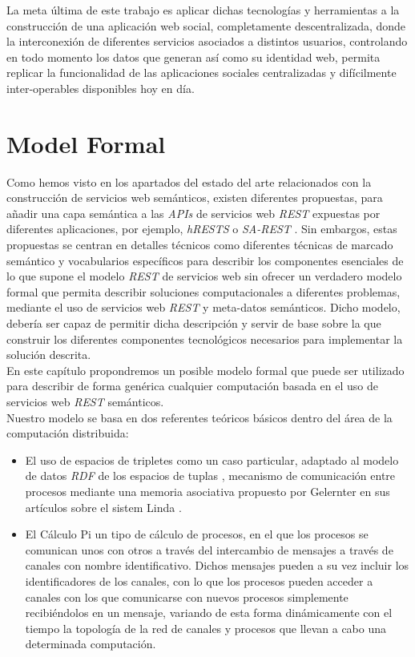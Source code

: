 La meta \'ultima de este trabajo es aplicar dichas tecnolog\'ias y herramientas a la construcci\'on de una aplicaci\'on web social, completamente descentralizada, donde la interconexi\'on de diferentes servicios asociados a distintos usuarios, controlando en todo momento los datos que generan as\'i como su identidad web, permita replicar la funcionalidad de las aplicaciones sociales centralizadas y dif\'icilmente inter-operables disponibles hoy en d\'ia.

\section{Model Formal}

Como hemos visto en los apartados del estado del arte relacionados con la construcci\'on de servicios web sem\'anticos, existen diferentes propuestas, para a\~nadir una capa sem\'antica a las \textit{APIs} de servicios web \textit{REST} expuestas por diferentes aplicaciones, por ejemplo, \textit{hRESTS} \cite{hrests} o \textit{SA-REST} \cite{sarest}. Sin embargos, estas propuestas se centran en detalles t\'ecnicos como diferentes t\'ecnicas de marcado sem\'antico y vocabularios espec\'ificos para describir los componentes esenciales de lo que supone el modelo \textit{REST} de servicios web sin ofrecer un verdadero modelo formal que permita describir soluciones computacionales a diferentes problemas, mediante el uso de servicios web \textit{REST} y meta-datos sem\'anticos. Dicho modelo, deber\'ia ser capaz de permitir dicha descripci\'on y servir de base sobre la que construir los diferentes componentes tecnol\'ogicos necesarios para implementar la soluci\'on descrita.\\
En este cap\'itulo propondremos un posible modelo formal que puede ser utilizado para describir de forma gen\'erica cualquier computaci\'on basada en el uso de servicios web \textit{REST} sem\'anticos.\\
Nuestro modelo se basa en dos referentes te\'oricos b\'asicos dentro del \'area de la computaci\'on distribuida:

\begin{itemize}
\item El uso de espacios de tripletes \cite{fensel2004triple} como un caso particular, adaptado al modelo de datos \textit{RDF} de los espacios de tuplas \cite{bussler2005minimal}, mecanismo de comunicaci\'on entre procesos mediante una memoria asociativa propuesto por Gelernter en sus art\'iculos sobre el sistem Linda \cite{linda}.

\item El C\'alculo Pi \cite{pi_calculus} un tipo de c\'alculo de procesos, en el que los procesos se comunican unos con otros a trav\'es del intercambio de mensajes a trav\'es de canales con nombre identificativo. Dichos mensajes pueden a su vez incluir los identificadores de los canales, con lo que los procesos pueden acceder a canales con los que comunicarse con nuevos procesos simplemente recibi\'endolos en un mensaje, variando de esta forma din\'amicamente con el tiempo la topolog\'ia de la red de canales y procesos que llevan a cabo una determinada computaci\'on.
\end{itemize}

